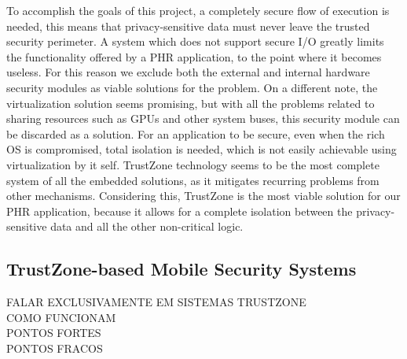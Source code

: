 To accomplish the goals of this project, a completely secure flow of execution is needed, this means that privacy-sensitive data must never leave the trusted security perimeter. A system which does not support secure I/O greatly limits the functionality offered by a \ac{PHR} application, to the point where it becomes useless. For this reason we exclude both the external and internal hardware security modules as viable solutions for the problem. On a different note, the virtualization solution seems promising, but with all the problems related to sharing resources such as \ac{GPUs} and other system buses, this security module can be discarded as a solution. For an application to be secure, even when the rich OS is compromised, total isolation is needed, which is not easily achievable using virtualization by it self. TrustZone technology seems to be the most complete system of all the embedded solutions, as it mitigates recurring problems from other mechanisms. Considering this, TrustZone is the most viable solution for our \ac{PHR} application, because it allows for a complete isolation between the privacy-sensitive data and all the other non-critical logic. 


\subsection{TrustZone-based Mobile Security Systems}
\label{sec:trustzone}

FALAR EXCLUSIVAMENTE EM SISTEMAS TRUSTZONE\\
COMO FUNCIONAM\\
PONTOS FORTES\\
PONTOS FRACOS\\




